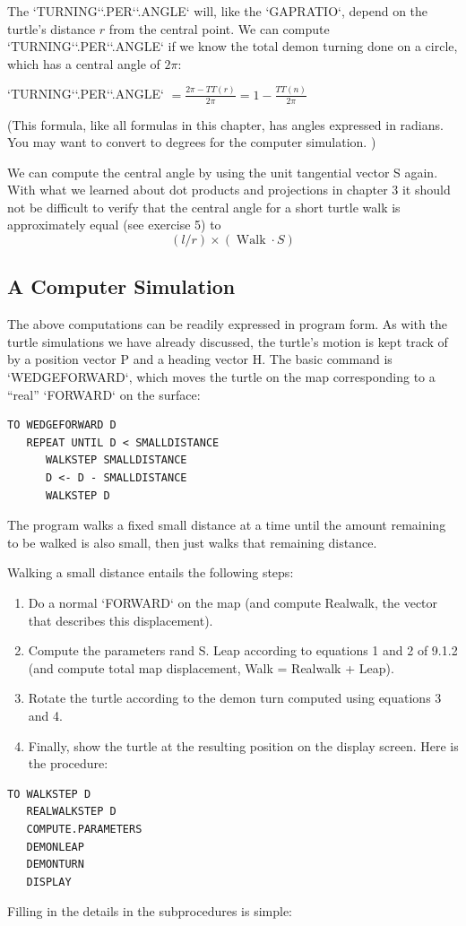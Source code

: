 \documentclass{book}
\begin{document}
The \textsc{`TURNING`}\textsc{`.PER`}\textsc{`.ANGLE`} will, like the \textsc{`GAPRATIO`}, depend on the turtle's
distance $r$ from the central point. We can compute \textsc{`TURNING`}\textsc{`.PER`}\textsc{`.ANGLE`}
if we know the total demon turning done on a circle, which has a central
angle of $2 \pi$:

\textsc{`TURNING`}\textsc{`.PER`}\textsc{`.ANGLE`} $= \frac {2 \pi - TT(r)} {2 \pi} = 1 - \frac {TT(n)} {2 \pi} $

(This formula, like all formulas in this chapter, has angles expressed
in radians. You may want to convert to degrees for the computer
simulation. )

We can compute the central angle by using the unit tangential vector
S again. With what we learned about dot products and projections in
chapter 3 it should not be difficult to verify that the central angle for a
short turtle walk is approximately equal (see exercise 5) to
$$(l/r) \times (\operatorname{Walk} \cdot S)$$

\subsection{A Computer Simulation}

The above computations can be readily expressed in program form. As
with the turtle simulations we have already discussed, the turtle's motion
is kept track of by a position vector P and a heading vector H. The
basic command is \textsc{`WEDGEFORWARD`}, which moves the turtle on the map
corresponding to a ``real'' \textsc{`FORWARD`} on the surface:

\begin{verbatim}
TO WEDGEFORWARD D
   REPEAT UNTIL D < SMALLDISTANCE
      WALKSTEP SMALLDISTANCE
      D <- D - SMALLDISTANCE
      WALKSTEP D
\end{verbatim}
The program walks a fixed small distance at a time until the amount
remaining to be walked is also small, then just walks that remaining
distance.

Walking a small distance entails the following steps:
\begin{enumerate}
\item Do a normal \textsc{`FORWARD`} on the map (and compute Realwalk, the vector
that describes this displacement).

\item Compute the parameters rand S. Leap according to equations 1 and
2 of 9.1.2 (and compute total map displacement, Walk = Realwalk +
Leap).

\item Rotate the turtle according to the demon turn computed using equations 3 and 4.

\item Finally, show the turtle at the resulting position on the display screen.
Here is the procedure:
\end{enumerate}
\begin{verbatim}
TO WALKSTEP D
   REALWALKSTEP D
   COMPUTE.PARAMETERS
   DEMONLEAP
   DEMONTURN
   DISPLAY
\end{verbatim}
Filling in the details in the subprocedures is simple:
\end{document}
